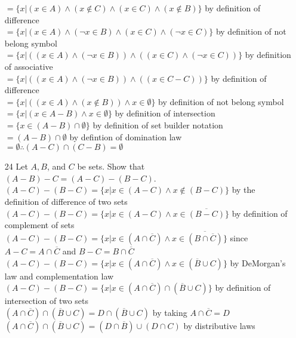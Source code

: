 \documentclass[a4paper]{article}
\newcommand\tab[1][0.5cm]{\hspace*{#1}}
\begin{document}
\begin{itemize}
    \tab\tab\tab\tab\tab $= \{x|(x \in A) \land (x \notin C) \land (x \in C) \land (x \notin B)\}$ by definition of difference \\
    \tab\tab\tab\tab\tab $= \{x|(x \in A) \land (\neg x \in B) \land (x \in C) \land (\neg x \in C)\}$ by definition of not belong symbol \\
    \tab\tab\tab\tab\tab $= \{x|((x \in A) \land (\neg x \in B)) \land ((x \in C) \land (\neg x \in C))\}$ by definition of associative \\
    \tab\tab\tab\tab\tab $= \{x|((x \in A) \land (\neg x \in B)) \land ((x \in C -C))\}$ by definition of difference \\
    \tab\tab\tab\tab\tab $= \{x|((x \in A) \land (x \notin B)) \land x \in \emptyset\}$ by definition of not belong symbol \\
    \tab\tab\tab\tab\tab $= \{x|(x \in A - B) \land x \in \emptyset\}$ by definition of intersection \\
    \tab\tab\tab\tab\tab $= \{x \in (A - B) \cap \emptyset\}$ by definition of set builder notation \\
    \tab\tab\tab\tab\tab $= (A - B) \cap \emptyset$ by defintion of domination law \\
    \tab\tab\tab\tab\tab $= \emptyset \therefore (A - C) \cap (C - B) = \emptyset$
  \item[24] Let $A, B$, and $C$ be sets. Show that $(A - B) - C = (A - C) - (B - C)$. \\
  \tab $(A - C) - (B - C) = \{x|x \in (A - C) \land x \notin (B - C)\}$ by the definition of difference of two sets \\
  \tab $(A - C) - (B - C) = \{x|x \in (A - C) \land x \in \overline{(B - C)}\}$ by definition of complement of sets \\
  \tab $(A - C) - (B - C) = \{x|x \in (A \cap \overline{C}) \land x \in \overline{(B \cap \overline{C})}\}$ since $A - C = A \cap \overline{C}$ and $B - C = B \cap \overline{C}$ \\
  \tab $(A - C) - (B - C) = \{x|x \in (A \cap \overline{C}) \land x \in (\overline{B} \cup C)\}$ by DeMorgan's law and complementation law \\
  \tab $(A - C) - (B - C) = \{x|x \in (A \cap \overline{C}) \cap (\overline{B} \cup C)\}$ by definition of intersection of two sets \\
  \tab $(A \cap \overline{C}) \cap (\overline{B} \cup C) = D \cap (\overline{B} \cup C)$ by taking $A \cap \overline{C} = D$ \\
  \tab $(A \cap \overline{C}) \cap (\overline{B} \cup C) = (D \cap \overline{B}) \cup (D \cap C)$ by distributive laws \\

\end{itemize}
\end{document}

